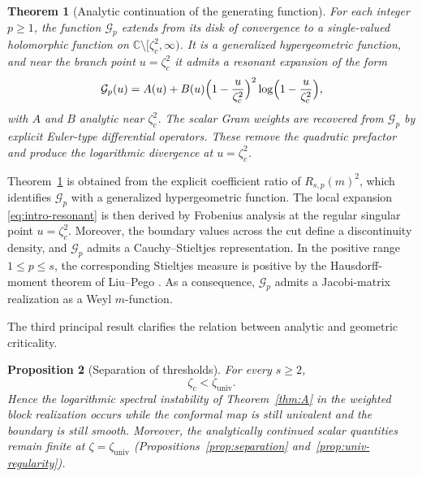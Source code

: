 \documentclass[11pt]{amsart}
\numberwithin{equation}{section}
\theoremstyle{plain}
\newtheorem{maintheorem}{Theorem}
\newtheorem{mainproposition}[maintheorem]{Proposition}
\theoremstyle{definition}
\theoremstyle{remark}
\newcommand{\CC}{\mathbb{C}}
\begin{document}
\begin{maintheorem}[Analytic continuation of the generating function]
	\label{thm:B}
	For each integer \(p\ge1\), the function \(\mathcal G_p\) extends from its disk
	of convergence to a single-valued holomorphic function on
	\(\CC\setminus[\zeta_c^2,\infty)\). It is a generalized hypergeometric
	function, and near the branch point \(u=\zeta_c^2\) it admits a resonant
	expansion of the form
	\begin{equation}\label{eq:intro-resonant}
		\mathcal G_p(u)
		=
		A(u)+B(u)\Bigl(1-\frac{u}{\zeta_c^2}\Bigr)^2
		\log\Bigl(1-\frac{u}{\zeta_c^2}\Bigr),
	\end{equation}
	with \(A\) and \(B\) analytic near \(\zeta_c^2\). The scalar Gram weights are recovered from \(\mathcal G_p\) by explicit
Euler-type differential operators. These remove the quadratic prefactor and
produce the logarithmic divergence at \(u=\zeta_c^2\).
\end{maintheorem}

Theorem~\ref{thm:B} is obtained from the explicit coefficient ratio of
\(R_{s,p}(m)^2\), which identifies \(\mathcal G_p\) with a generalized
hypergeometric function. The local expansion
\eqref{eq:intro-resonant} is then derived by Frobenius analysis at the
regular singular point \(u=\zeta_c^2\). Moreover, the boundary values across
the cut define a discontinuity density, and \(\mathcal G_p\) admits a
Cauchy--Stieltjes representation. In the positive range \(1\le p\le s\), the corresponding Stieltjes measure is
positive by the Hausdorff-moment theorem of Liu--Pego
\cite{LiuPego2016,LiuPegoCorrigendum2026}. As a consequence, \(\mathcal G_p\)
admits a Jacobi-matrix realization as a Weyl \(m\)-function.


The third principal result clarifies the relation between analytic and
geometric criticality.

\begin{mainproposition}[Separation of thresholds]
	\label{prop:C}
	For every \(s\ge2\),
	\begin{equation}\label{eq:intro-separation}
		\zeta_c<\zeta_{\mathrm{univ}}.
	\end{equation}
	Hence the logarithmic spectral instability of Theorem~\ref{thm:A} in the weighted block realization occurs
	while the conformal map is still univalent and the boundary is still
	smooth. Moreover, the analytically continued scalar quantities remain finite at
	\(\zeta=\zeta_{\mathrm{univ}}\)
	\textup{(Propositions~\ref{prop:separation} and~\ref{prop:univ-regularity})}.
\end{mainproposition}
\end{document}
